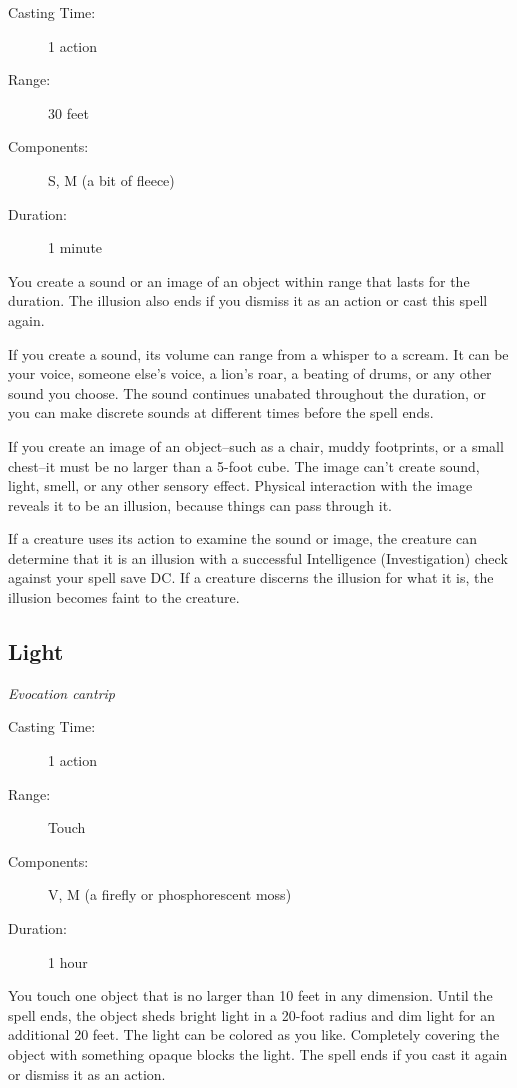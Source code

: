 \documentclass[letterpaper,10pt,twoside,twocolumn,openany]{book}
\begin{document}
\begin{description}
	\item[Casting Time:] 1 action 
	\item[Range:] 30 feet 
	\item[Components:] S, M (a bit of fleece)
	\item[Duration:] 1 minute 
\end{description}

You create a sound or an image of an object within range that lasts for the duration. The illusion also ends if you dismiss it as an action or cast this spell again.

If you create a sound, its volume can range from a whisper to a scream. It can be your voice, someone else's voice, a lion's roar, a beating of drums, or any other sound you choose. The sound continues unabated throughout the duration, or you can make discrete sounds at different times before the spell ends.

If you create an image of an object--such as a chair, muddy footprints, or a small chest--it must be no larger than a 5-foot cube. The image can't create sound, light, smell, or any other sensory effect. Physical interaction with the image reveals it to be an illusion, because things can pass through it.

If a creature uses its action to examine the sound or image, the creature can determine that it is an illusion with a successful Intelligence (Investigation) check against your spell save DC. If a creature discerns the illusion for what it is, the illusion becomes faint to the creature. 

\subsection{Light} \hypertarget{Light}{}
\begin{hangingpar}
	\textit{Evocation cantrip}
\end{hangingpar}

\begin{description}
	\item[Casting Time:] 1 action 
	\item[Range:] Touch 
	\item[Components:] V, M (a firefly or phosphorescent moss) 
	\item[Duration:] 1 hour 
\end{description}

You touch one object that is no larger than 10 feet in any dimension. Until the spell ends, the object sheds bright light in a 20-foot radius and dim light for an additional 20 feet. The light can be colored as you like. Completely covering the object with something opaque blocks the light. The spell ends if you cast it again or dismiss it as an action.
\end{document}

